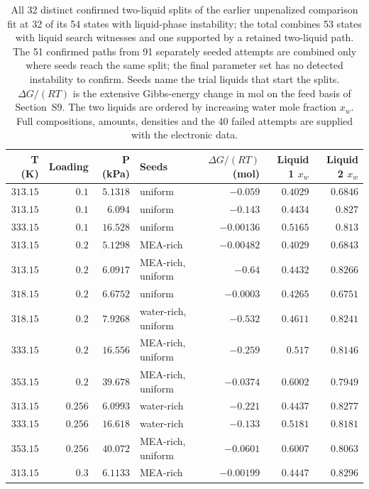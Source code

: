 \begin{table}[!htbp]\small\setlength{\tabcolsep}{3pt}\centering
\caption{All 32 distinct confirmed two-liquid splits of the earlier unpenalized comparison fit at 32 of its 54 states with liquid-phase instability; the total combines 53 states with liquid search witnesses and one supported by a retained two-liquid path. The 51 confirmed paths from 91 separately seeded attempts are combined only where seeds reach the same split; the final parameter set has no detected instability to confirm. Seeds name the trial liquids that start the splits. $\Delta G/(RT)$ is the extensive Gibbs-energy change in mol on the feed basis of Section~S9. The two liquids are ordered by increasing water mole fraction $x_w$. Full compositions, amounts, densities and the 40 failed attempts are supplied with the electronic data.}\label{tab:phase-splits}
\begin{tabular}{@{}rrrlrrr@{}}
\toprule
T (K) & Loading & P (kPa) & Seeds & $\Delta G/(RT)$ (mol) & Liquid 1 $x_w$ & Liquid 2 $x_w$ \\
\midrule
$313.15$ & $0.1$ & $5.1318$ & uniform & $-0.059$ & $0.4029$ & $0.6846$ \\
$313.15$ & $0.1$ & $6.094$ & uniform & $-0.143$ & $0.4434$ & $0.827$ \\
$333.15$ & $0.1$ & $16.528$ & uniform & $-0.00136$ & $0.5165$ & $0.813$ \\
$313.15$ & $0.2$ & $5.1298$ & MEA-rich & $-0.00482$ & $0.4029$ & $0.6843$ \\
$313.15$ & $0.2$ & $6.0917$ & MEA-rich, uniform & $-0.64$ & $0.4432$ & $0.8266$ \\
$318.15$ & $0.2$ & $6.6752$ & uniform & $-0.0003$ & $0.4265$ & $0.6751$ \\
$318.15$ & $0.2$ & $7.9268$ & water-rich, uniform & $-0.532$ & $0.4611$ & $0.8241$ \\
$333.15$ & $0.2$ & $16.556$ & MEA-rich, uniform & $-0.259$ & $0.517$ & $0.8146$ \\
$353.15$ & $0.2$ & $39.678$ & MEA-rich, uniform & $-0.0374$ & $0.6002$ & $0.7949$ \\
$313.15$ & $0.256$ & $6.0993$ & water-rich & $-0.221$ & $0.4437$ & $0.8277$ \\
$333.15$ & $0.256$ & $16.618$ & water-rich & $-0.133$ & $0.5181$ & $0.8181$ \\
$353.15$ & $0.256$ & $40.072$ & MEA-rich, uniform & $-0.0601$ & $0.6007$ & $0.8063$ \\
$313.15$ & $0.3$ & $6.1133$ & MEA-rich & $-0.00199$ & $0.4447$ & $0.8296$ \\

\end{tabular}
\end{table}
